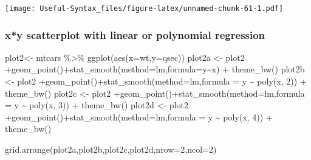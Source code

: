 \documentclass[
]{article}
\newenvironment{Shaded}{\begin{snugshade}}{\end{snugshade}}
\newcommand{\AttributeTok}[1]{\textcolor[rgb]{0.77,0.63,0.00}{#1}}
\newcommand{\DecValTok}[1]{\textcolor[rgb]{0.00,0.00,0.81}{#1}}
\newcommand{\FunctionTok}[1]{\textcolor[rgb]{0.00,0.00,0.00}{#1}}
\newcommand{\NormalTok}[1]{#1}
\newcommand{\OtherTok}[1]{\textcolor[rgb]{0.56,0.35,0.01}{#1}}
\newcommand{\SpecialCharTok}[1]{\textcolor[rgb]{0.00,0.00,0.00}{#1}}
\newcommand{\StringTok}[1]{\textcolor[rgb]{0.31,0.60,0.02}{#1}}
\begin{document}
\texttt{[image: Useful-Syntax\_files/figure-latex/unnamed-chunk-61-1.pdf]}

\hypertarget{xy-scatterplot-with-linear-or-polynomial-regression}{%
\subsubsection{x*y scatterplot with linear or polynomial regression}\label{xy-scatterplot-with-linear-or-polynomial-regression}}

\begin{Shaded}
\begin{Highlighting}[]
\NormalTok{plot2}\OtherTok{\textless{}{-}}\NormalTok{ mtcars }\SpecialCharTok{\%\textgreater{}\%} \FunctionTok{ggplot}\NormalTok{(}\FunctionTok{aes}\NormalTok{(}\AttributeTok{x=}\NormalTok{wt,}\AttributeTok{y=}\NormalTok{qsec))}
\NormalTok{plot2a }\OtherTok{\textless{}{-}}\NormalTok{ plot2 }\SpecialCharTok{+}\FunctionTok{geom\_point}\NormalTok{()}\SpecialCharTok{+}\FunctionTok{stat\_smooth}\NormalTok{(}\AttributeTok{method=}\StringTok{\textquotesingle{}lm\textquotesingle{}}\NormalTok{,}\AttributeTok{formula=}\NormalTok{y}\SpecialCharTok{\textasciitilde{}}\NormalTok{x) }\SpecialCharTok{+} \FunctionTok{theme\_bw}\NormalTok{()}
\NormalTok{plot2b }\OtherTok{\textless{}{-}}\NormalTok{ plot2 }\SpecialCharTok{+}\FunctionTok{geom\_point}\NormalTok{()}\SpecialCharTok{+}\FunctionTok{stat\_smooth}\NormalTok{(}\AttributeTok{method=}\StringTok{\textquotesingle{}lm\textquotesingle{}}\NormalTok{,}\AttributeTok{formula =}\NormalTok{ y }\SpecialCharTok{\textasciitilde{}} \FunctionTok{poly}\NormalTok{(x, }\DecValTok{2}\NormalTok{)) }\SpecialCharTok{+} \FunctionTok{theme\_bw}\NormalTok{()}
\NormalTok{plot2c }\OtherTok{\textless{}{-}}\NormalTok{ plot2 }\SpecialCharTok{+}\FunctionTok{geom\_point}\NormalTok{()}\SpecialCharTok{+}\FunctionTok{stat\_smooth}\NormalTok{(}\AttributeTok{method=}\StringTok{\textquotesingle{}lm\textquotesingle{}}\NormalTok{,}\AttributeTok{formula =}\NormalTok{ y }\SpecialCharTok{\textasciitilde{}} \FunctionTok{poly}\NormalTok{(x, }\DecValTok{3}\NormalTok{)) }\SpecialCharTok{+} \FunctionTok{theme\_bw}\NormalTok{()}
\NormalTok{plot2d }\OtherTok{\textless{}{-}}\NormalTok{ plot2 }\SpecialCharTok{+}\FunctionTok{geom\_point}\NormalTok{()}\SpecialCharTok{+}\FunctionTok{stat\_smooth}\NormalTok{(}\AttributeTok{method=}\StringTok{\textquotesingle{}lm\textquotesingle{}}\NormalTok{,}\AttributeTok{formula =}\NormalTok{ y }\SpecialCharTok{\textasciitilde{}} \FunctionTok{poly}\NormalTok{(x, }\DecValTok{4}\NormalTok{)) }\SpecialCharTok{+} \FunctionTok{theme\_bw}\NormalTok{()}

\FunctionTok{grid.arrange}\NormalTok{(plot2a,plot2b,plot2c,plot2d,}\AttributeTok{nrow=}\DecValTok{2}\NormalTok{,}\AttributeTok{ncol=}\DecValTok{2}\NormalTok{)}
\end{Highlighting}
\end{Shaded}
\end{document}
